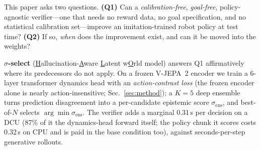 \documentclass[11pt]{article}
\newcommand{\std}{\sigma_{\mathrm{ens}}}
\begin{document}
This paper asks two questions. \textbf{(Q1)} Can a \emph{calibration-free}, \emph{goal-free}, policy-agnostic verifier---one that needs no reward data, no goal specification, and no statistical calibration set---improve an imitation-trained robot policy at test time? \textbf{(Q2)} If so, \emph{when} does the improvement exist, and can it be moved into the weights?

\textbf{$\sigma$-select} (\underline{H}allucination-\underline{A}ware \underline{L}atent w\underline{O}rld model) answers Q1 affirmatively where its predecessors do not apply. On a frozen V-JEPA~2 encoder we train a 6-layer transformer dynamics head with an \emph{action-contrast loss} (the frozen encoder alone is nearly action-insensitive; Sec.~\ref{sec:method}); a $K{=}5$ deep ensemble turns prediction disagreement into a per-candidate epistemic score $\std$, and best-of-$N$ selects $\arg\min \std$. The verifier adds a marginal 0.31\,s per decision on a DCU (87\% of it the dynamics-head forward itself; the policy chunk it scores costs 0.32\,s on CPU and is paid in the base condition too), against seconds-per-step generative rollouts.
\end{document}
